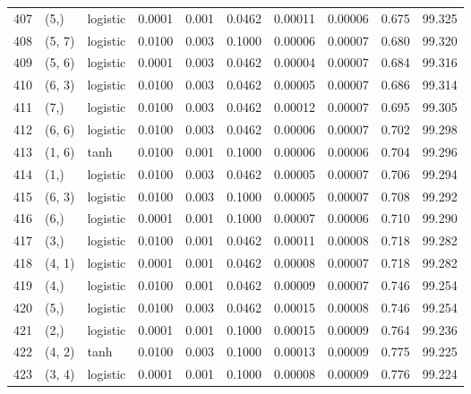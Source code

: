 \begin{tabular}{lllrrrrrrr}
407 &        (5,) &  logistic &  0.0001 &  0.001 &  0.0462 &          0.00011 &    0.00006 &       0.675 &    99.325 \\
408 &      (5, 7) &  logistic &  0.0100 &  0.003 &  0.1000 &          0.00006 &    0.00007 &       0.680 &    99.320 \\
409 &      (5, 6) &  logistic &  0.0001 &  0.003 &  0.0462 &          0.00004 &    0.00007 &       0.684 &    99.316 \\
410 &      (6, 3) &  logistic &  0.0100 &  0.003 &  0.0462 &          0.00005 &    0.00007 &       0.686 &    99.314 \\
411 &        (7,) &  logistic &  0.0100 &  0.003 &  0.0462 &          0.00012 &    0.00007 &       0.695 &    99.305 \\
412 &      (6, 6) &  logistic &  0.0100 &  0.003 &  0.0462 &          0.00006 &    0.00007 &       0.702 &    99.298 \\
413 &      (1, 6) &      tanh &  0.0100 &  0.001 &  0.1000 &          0.00006 &    0.00006 &       0.704 &    99.296 \\
414 &        (1,) &  logistic &  0.0100 &  0.003 &  0.0462 &          0.00005 &    0.00007 &       0.706 &    99.294 \\
415 &      (6, 3) &  logistic &  0.0100 &  0.003 &  0.1000 &          0.00005 &    0.00007 &       0.708 &    99.292 \\
416 &        (6,) &  logistic &  0.0001 &  0.001 &  0.1000 &          0.00007 &    0.00006 &       0.710 &    99.290 \\
417 &        (3,) &  logistic &  0.0100 &  0.001 &  0.0462 &          0.00011 &    0.00008 &       0.718 &    99.282 \\
418 &      (4, 1) &  logistic &  0.0001 &  0.001 &  0.0462 &          0.00008 &    0.00007 &       0.718 &    99.282 \\
419 &        (4,) &  logistic &  0.0100 &  0.001 &  0.0462 &          0.00009 &    0.00007 &       0.746 &    99.254 \\
420 &        (5,) &  logistic &  0.0100 &  0.003 &  0.0462 &          0.00015 &    0.00008 &       0.746 &    99.254 \\
421 &        (2,) &  logistic &  0.0001 &  0.001 &  0.1000 &          0.00015 &    0.00009 &       0.764 &    99.236 \\
422 &      (4, 2) &      tanh &  0.0100 &  0.003 &  0.1000 &          0.00013 &    0.00009 &       0.775 &    99.225 \\
423 &      (3, 4) &  logistic &  0.0001 &  0.001 &  0.1000 &          0.00008 &    0.00009 &       0.776 &    99.224 \\

\end{tabular}
